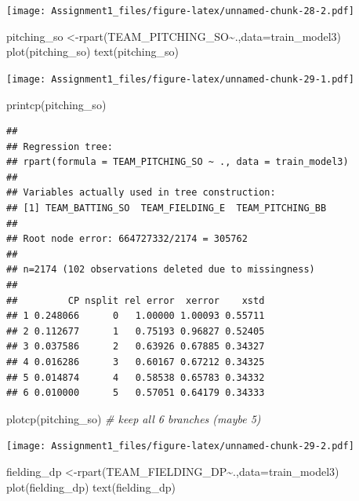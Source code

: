 \documentclass[
]{article}
\newenvironment{Shaded}{\begin{snugshade}}{\end{snugshade}}
\newcommand{\AttributeTok}[1]{\textcolor[rgb]{0.77,0.63,0.00}{#1}}
\newcommand{\CommentTok}[1]{\textcolor[rgb]{0.56,0.35,0.01}{\textit{#1}}}
\newcommand{\FunctionTok}[1]{\textcolor[rgb]{0.00,0.00,0.00}{#1}}
\newcommand{\NormalTok}[1]{#1}
\newcommand{\OtherTok}[1]{\textcolor[rgb]{0.56,0.35,0.01}{#1}}
\newcommand{\SpecialCharTok}[1]{\textcolor[rgb]{0.00,0.00,0.00}{#1}}
\begin{document}
\texttt{[image: Assignment1\_files/figure-latex/unnamed-chunk-28-2.pdf]}

\begin{Shaded}
\begin{Highlighting}[]
\NormalTok{pitching\_so }\OtherTok{\textless{}{-}}\FunctionTok{rpart}\NormalTok{(TEAM\_PITCHING\_SO}\SpecialCharTok{\textasciitilde{}}\NormalTok{.,}\AttributeTok{data=}\NormalTok{train\_model3)}
\FunctionTok{plot}\NormalTok{(pitching\_so)}
\FunctionTok{text}\NormalTok{(pitching\_so)}
\end{Highlighting}
\end{Shaded}

\texttt{[image: Assignment1\_files/figure-latex/unnamed-chunk-29-1.pdf]}

\begin{Shaded}
\begin{Highlighting}[]
\FunctionTok{printcp}\NormalTok{(pitching\_so)}
\end{Highlighting}
\end{Shaded}

\begin{verbatim}
## 
## Regression tree:
## rpart(formula = TEAM_PITCHING_SO ~ ., data = train_model3)
## 
## Variables actually used in tree construction:
## [1] TEAM_BATTING_SO  TEAM_FIELDING_E  TEAM_PITCHING_BB
## 
## Root node error: 664727332/2174 = 305762
## 
## n=2174 (102 observations deleted due to missingness)
## 
##         CP nsplit rel error  xerror    xstd
## 1 0.248066      0   1.00000 1.00093 0.55711
## 2 0.112677      1   0.75193 0.96827 0.52405
## 3 0.037586      2   0.63926 0.67885 0.34327
## 4 0.016286      3   0.60167 0.67212 0.34325
## 5 0.014874      4   0.58538 0.65783 0.34332
## 6 0.010000      5   0.57051 0.64179 0.34333
\end{verbatim}

\begin{Shaded}
\begin{Highlighting}[]
\FunctionTok{plotcp}\NormalTok{(pitching\_so) }\CommentTok{\# keep all 6 branches (maybe 5)}
\end{Highlighting}
\end{Shaded}

\texttt{[image: Assignment1\_files/figure-latex/unnamed-chunk-29-2.pdf]}

\begin{Shaded}
\begin{Highlighting}[]
\NormalTok{fielding\_dp }\OtherTok{\textless{}{-}}\FunctionTok{rpart}\NormalTok{(TEAM\_FIELDING\_DP}\SpecialCharTok{\textasciitilde{}}\NormalTok{.,}\AttributeTok{data=}\NormalTok{train\_model3)}
\FunctionTok{plot}\NormalTok{(fielding\_dp)}
\FunctionTok{text}\NormalTok{(fielding\_dp)}
\end{Highlighting}
\end{Shaded}
\end{document}
